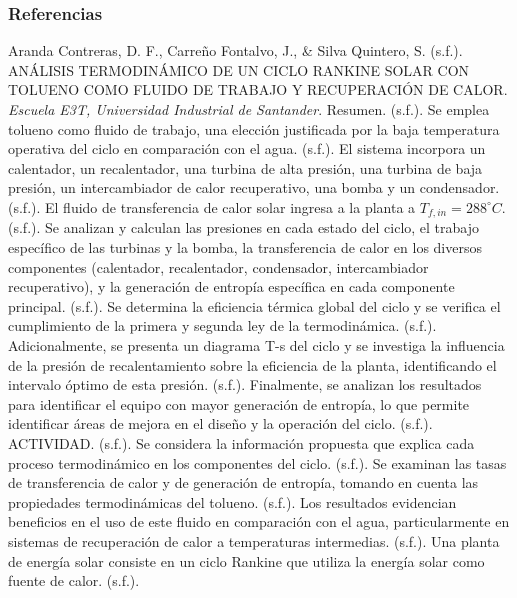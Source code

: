 \documentclass{beamer}
\begin{document}
\begin{frame}
    \frametitle{Referencias}
    \begin{thebibliography}{9}
         Aranda Contreras, D. F., Carreño Fontalvo, J., \& Silva Quintero, S. (s.f.). ANÁLISIS TERMODINÁMICO DE UN CICLO RANKINE SOLAR CON TOLUENO COMO FLUIDO DE TRABAJO Y RECUPERACIÓN DE CALOR. \textit{Escuela E3T, Universidad Industrial de Santander}. 
         Resumen. (s.f.). 
         Se emplea tolueno como fluido de trabajo, una elección justificada por la baja temperatura operativa del ciclo en comparación con el agua. (s.f.). 
         El sistema incorpora un calentador, un recalentador, una turbina de alta presión, una turbina de baja presión, un intercambiador de calor recuperativo, una bomba y un condensador. (s.f.). 
         El fluido de transferencia de calor solar ingresa a la planta a $T_{f,in}=288^{\circ}C$. (s.f.). 
         Se analizan y calculan las presiones en cada estado del ciclo, el trabajo específico de las turbinas y la bomba, la transferencia de calor en los diversos componentes (calentador, recalentador, condensador, intercambiador recuperativo), y la generación de entropía específica en cada componente principal. (s.f.). 
         Se determina la eficiencia térmica global del ciclo y se verifica el cumplimiento de la primera y segunda ley de la termodinámica. (s.f.). 
         Adicionalmente, se presenta un diagrama T-s del ciclo y se investiga la influencia de la presión de recalentamiento sobre la eficiencia de la planta, identificando el intervalo óptimo de esta presión. (s.f.). 
         Finalmente, se analizan los resultados para identificar el equipo con mayor generación de entropía, lo que permite identificar áreas de mejora en el diseño y la operación del ciclo. (s.f.). 
         ACTIVIDAD. (s.f.). 
         Se considera la información propuesta que explica cada proceso termodinámico en los componentes del ciclo. (s.f.). 
         Se examinan las tasas de transferencia de calor y de generación de entropía, tomando en cuenta las propiedades termodinámicas del tolueno. (s.f.). 
         Los resultados evidencian beneficios en el uso de este fluido en comparación con el agua, particularmente en sistemas de recuperación de calor a temperaturas intermedias. (s.f.). 
         Una planta de energía solar consiste en un ciclo Rankine que utiliza la energía solar como fuente de calor. (s.f.). 

\end{thebibliography}
\end{frame}
\end{document}
